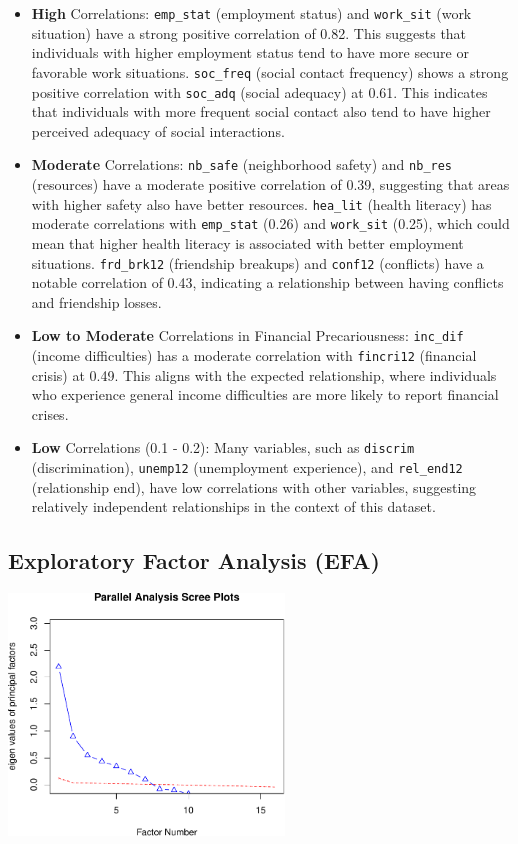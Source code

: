 \documentclass[
]{article}
\begin{document}
\begin{itemize}
\item
  \textbf{High} Correlations: \texttt{emp\_stat} (employment status) and
  \texttt{work\_sit} (work situation) have a strong positive correlation
  of 0.82. This suggests that individuals with higher employment status
  tend to have more secure or favorable work situations.
  \texttt{soc\_freq} (social contact frequency) shows a strong positive
  correlation with \texttt{soc\_adq} (social adequacy) at 0.61. This
  indicates that individuals with more frequent social contact also tend
  to have higher perceived adequacy of social interactions.
\item
  \textbf{Moderate} Correlations: \texttt{nb\_safe} (neighborhood
  safety) and \texttt{nb\_res} (resources) have a moderate positive
  correlation of 0.39, suggesting that areas with higher safety also
  have better resources. \texttt{hea\_lit} (health literacy) has
  moderate correlations with \texttt{emp\_stat} (0.26) and
  \texttt{work\_sit} (0.25), which could mean that higher health
  literacy is associated with better employment situations.
  \texttt{frd\_brk12} (friendship breakups) and \texttt{conf12}
  (conflicts) have a notable correlation of 0.43, indicating a
  relationship between having conflicts and friendship losses.
\item
  \textbf{Low to Moderate} Correlations in Financial Precariousness:
  \texttt{inc\_dif} (income difficulties) has a moderate correlation
  with \texttt{fincri12} (financial crisis) at 0.49. This aligns with
  the expected relationship, where individuals who experience general
  income difficulties are more likely to report financial crises.
\item
  \textbf{Low} Correlations (0.1 - 0.2): Many variables, such as
  \texttt{discrim} (discrimination), \texttt{unemp12} (unemployment
  experience), and \texttt{rel\_end12} (relationship end), have low
  correlations with other variables, suggesting relatively independent
  relationships in the context of this dataset.
\end{itemize}

\subsection{Exploratory Factor Analysis
(EFA)}\label{exploratory-factor-analysis-efa}

\begin{center}
\includegraphics[width=0.55\textwidth,height=\textheight]{draft_v1_files/figure-pdf/unnamed-chunk-13-1.pdf}
\end{center}
\end{document}
